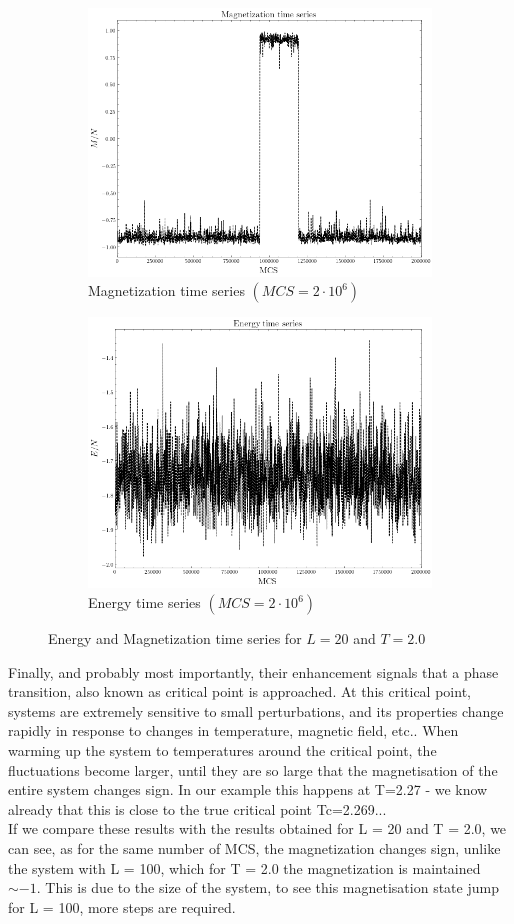 \documentclass[article]{revtex4}
\begin{document}
\begin{figure}[h!]
\begin{subfigure}{.5\textwidth}
  \centering
  \includegraphics[width=0.8\linewidth]{magnetizationL20.png}
  \caption{Magnetization time series $ (MCS = 2 \cdot10^{6})$}
\end{subfigure}%
\begin{subfigure}{.5\textwidth}
  \centering
  \includegraphics[width=0.8\linewidth]{energyL20.png}
  \caption{Energy time series $ (MCS = 2 \cdot10^{6})$}
\end{subfigure}
\caption{Energy and Magnetization time series for $L = 20$ and $T = 2.0$}
\end{figure}
 Finally, and probably most importantly, their enhancement signals that a phase transition, also known as critical point is approached. At this critical point, systems are extremely sensitive to small perturbations, and its properties change rapidly in response to changes in temperature, magnetic field, etc.. When warming up the system to temperatures around the critical point, the fluctuations become larger, until they are so large that the magnetisation of the entire system changes sign. In our example this happens at T=2.27 - we know already that this is close to the true critical point Tc=2.269...
\\
If we compare these results with the results obtained for L = 20 and T = 2.0, we can see, as for the same number of MCS, the magnetization changes sign, unlike the system with L = 100, which for T = 2.0 the magnetization is maintained $\sim -1$. This is due to the size of the system, to see this magnetisation state jump for L = 100, more steps are required.
\end{document}
